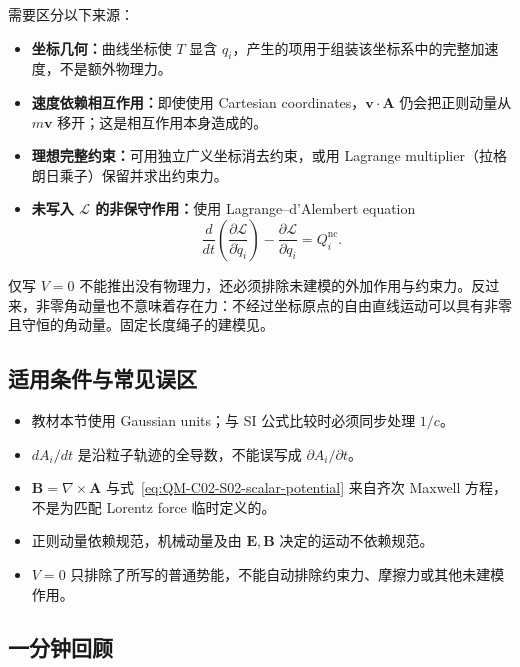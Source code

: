 需要区分以下来源：
\begin{itemize}[leftmargin=*]
  \item \textbf{坐标几何：}曲线坐标使 $T$ 显含 $q_i$，产生的项用于组装该坐标系中的完整加速度，不是额外物理力。
  \item \textbf{速度依赖相互作用：}即使使用 Cartesian coordinates，$\bm v\cdot\bm A$ 仍会把正则动量从 $m\bm v$ 移开；这是相互作用本身造成的。
  \item \textbf{理想完整约束：}可用独立广义坐标消去约束，或用 Lagrange multiplier（拉格朗日乘子）保留并求出约束力。
  \item \textbf{未写入 $\mathcal L$ 的非保守作用：}使用 Lagrange--d'Alembert equation
  \begin{equation}
    \frac{d}{dt}\left(\frac{\partial\mathcal L}{\partial\dot q_i}\right)
    -\frac{\partial\mathcal L}{\partial q_i}
    =Q_i^{\mathrm{nc}}.
    \label{eq:QM-C02-S02-lagrange-dalembert}
  \end{equation}
\end{itemize}
仅写 $V=0$ 不能推出没有物理力，还必须排除未建模的外加作用与约束力。反过来，非零角动量也不意味着存在力：不经过坐标原点的自由直线运动可以具有非零且守恒的角动量。固定长度绳子的建模见。

\subsection{适用条件与常见误区}

\begin{itemize}[leftmargin=*]
  \item 教材本节使用 Gaussian units；与 SI 公式比较时必须同步处理 $1/c$。
  \item $dA_i/dt$ 是沿粒子轨迹的全导数，不能误写成 $\partial A_i/\partial t$。
  \item $\bm B=\nabla\times\bm A$ 与式~\eqref{eq:QM-C02-S02-scalar-potential} 来自齐次 Maxwell 方程，不是为匹配 Lorentz force 临时定义的。
  \item 正则动量依赖规范，机械动量及由 $\bm E,\bm B$ 决定的运动不依赖规范。
  \item $V=0$ 只排除了所写的普通势能，不能自动排除约束力、摩擦力或其他未建模作用。
\end{itemize}

\subsection{一分钟回顾}

